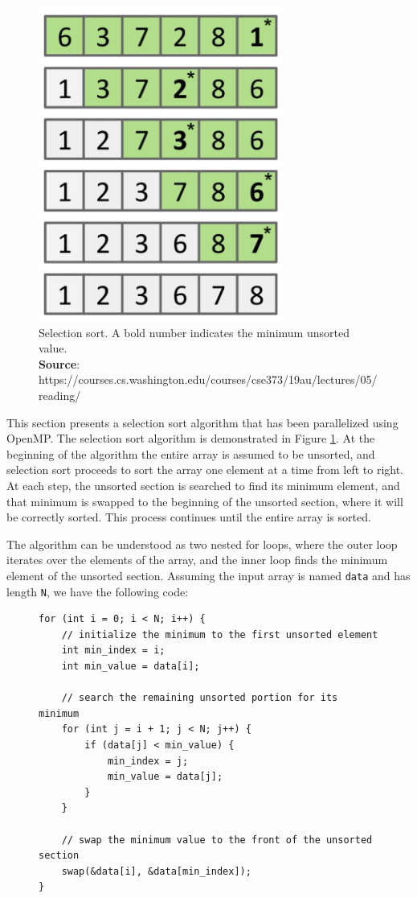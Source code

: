 \documentclass{article}
\theoremstyle{definition}
\begin{document}
\begin{figure}
    \centering
    \includegraphics{images/selection-sort.png}
    \caption{Selection sort. A bold number indicates the minimum unsorted value.\\
    \textbf{Source}: https://courses.cs.washington.edu/courses/cse373/19au/lectures/05/reading/}
    \label{fig/selection-sort}
\end{figure}

This section presents a selection sort algorithm that has been parallelized using OpenMP. The selection sort algorithm is demonstrated in Figure \ref{fig/selection-sort}. At the beginning of the algorithm the entire array is assumed to be unsorted, and selection sort proceeds to sort the array one element at a time from left to right. At each step, the unsorted section is searched to find its minimum element, and that minimum is swapped to the beginning of the unsorted section, where it will be correctly sorted. This process continues until the entire array is sorted.

The algorithm can be understood as two nested for loops, where the outer loop iterates over the elements of the array, and the inner loop finds the minimum element of the unsorted section. Assuming the input array is named \texttt{data} and has length \texttt{N}, we have the following code:

\begin{figure}[H]
\begin{verbatim}
for (int i = 0; i < N; i++) {
    // initialize the minimum to the first unsorted element
    int min_index = i;
    int min_value = data[i];
    
    // search the remaining unsorted portion for its minimum
    for (int j = i + 1; j < N; j++) {
        if (data[j] < min_value) {
            min_index = j;
            min_value = data[j];
        }
    }
    
    // swap the minimum value to the front of the unsorted section
    swap(&data[i], &data[min_index]);
}
\end{verbatim}
\end{figure}
\end{document}
